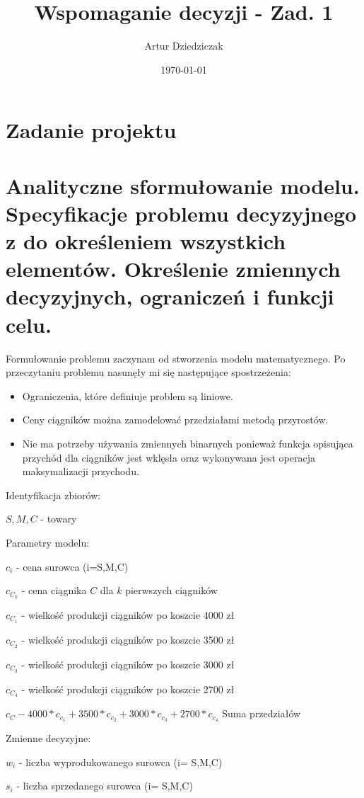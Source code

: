 \documentclass{article}
\title{Wspomaganie decyzji - Zad. 1}
\author{Artur Dziedziczak}
\date{\today}
\begin{document}
\maketitle

\section{Zadanie projektu}

\section{Analityczne sformułowanie modelu. Specyfikacje problemu decyzyjnego z do określeniem wszystkich elementów. Określenie zmiennych decyzyjnych, ograniczeń i funkcji celu.}

Formułowanie problemu zaczynam od stworzenia modelu matematycznego.
Po przeczytaniu problemu nasunęły mi się następujące spostrzeżenia:

\begin{itemize}
	\item Ograniczenia, które definiuje problem są liniowe.
	\item Ceny ciągników można zamodelować przedziałami metodą przyrostów.
	\item Nie ma potrzeby używania zmiennych binarnych ponieważ funkcja opisująca przychód dla ciągników jest wklęsła oraz wykonywana jest operacja maksymalizacji przychodu.
\end{itemize}


Identyfikacja zbiorów: 

${ S, M ,C }$ - towary

Parametry modelu:

$c_i$ - cena surowca (i=S,M,C)

$c_C_k$ - cena ciągnika $C$ dla $k$ pierwszych ciągników

$c_C_1$ - wielkość produkcji ciągników po koszcie 4000 zł

$c_C_2$ - wielkość produkcji ciągników po koszcie 3500 zł

$c_C_3$ - wielkość produkcji ciągników po koszcie 3000 zł

$c_C_4$ - wielkość produkcji ciągników po koszcie 2700 zł

$c_C - 4000 * c_c_1 + 3500 * c_c_2 + 3000 * c_c_3 + 2700 * c_c_4$ Suma przedziałów

Zmienne decyzyjne:

$w_i$ - liczba wyprodukowanego surowca (i= S,M,C)

$s_i$ - liczba sprzedanego surowca (i= S,M,C)
\end{document}
